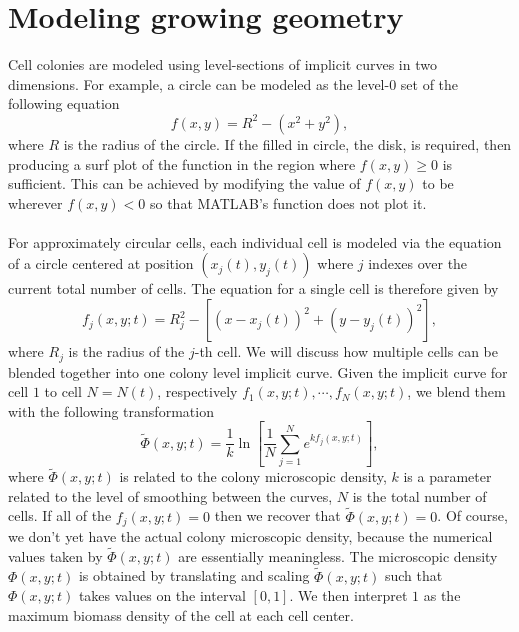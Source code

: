 \section{Modeling growing geometry }
Cell colonies are modeled using level-sections of implicit curves in two dimensions. For example, a circle can be modeled as the level-0 set of the following equation
\begin{equation*}
    f(x,y) =R^2-( x^2 + y^2),
\end{equation*}
where $R$ is the radius of the circle. If the filled in circle, the disk, is required, then producing a surf plot of the function in the region where $f(x,y) \geq 0$ is sufficient. This can be achieved by modifying the value of $f(x,y)$ to be  wherever $f(x,y)<0$ so that MATLAB's  function does not plot it.
\\
\\
For approximately circular cells, each individual cell is modeled via the equation of a circle centered at position $(x_j(t),y_j(t))$ where $j$ indexes over the current total number of cells. The equation for a single cell is therefore given by
\begin{equation*}
    f_j(x,y;t) =R_j^2- \left[ (x-x_j(t))^2 + (y-y_j(t))^2\right],
\end{equation*}
where $R_j$ is the radius of the $j$-th cell. We will discuss how multiple cells can be blended together into one colony level implicit curve. Given the implicit curve for cell $1$ to cell $N = N(t)$, respectively $f_1(x,y;t), \cdots, f_N(x,y; t)$, we blend them with the following transformation
\begin{equation*}
    \tilde{\Phi}(x,y;t) = \frac{1}{k}\ln{ \left[ \frac{1}{N} \sum_{j=1}^N{ e^{k f_j(x,y;t)}} \right]},
\end{equation*}
where $\tilde{\Phi}(x,y;t) $ is related to the colony microscopic density, $k$ is a parameter related to the level of smoothing between the curves, $N$ is the total number of cells. If all of the $f_j(x,y;t) =0$ then we recover that $\tilde{\Phi}(x,y;t) =0$. Of course, we don't yet have the actual colony microscopic density, because the numerical values taken by $\tilde{\Phi}(x,y;t) $ are essentially meaningless. The microscopic density $\Phi(x,y;t)$ is obtained by translating and scaling $\tilde{\Phi}(x,y;t) $ such that $\Phi(x,y;t) $ takes values on the interval $[0,1]$. We then interpret $1$ as the maximum biomass density of the cell at each cell center.

